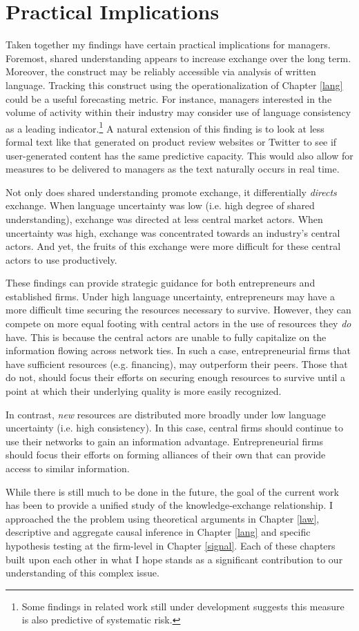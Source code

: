 \section{Practical Implications}
Taken together my findings have certain practical implications for managers. Foremost, shared understanding appears to increase exchange over the long term. Moreover, the construct may be reliably accessible via analysis of written language. Tracking this construct using the operationalization of Chapter \ref{lang} could be a useful forecasting metric. For instance, managers interested in the volume of activity within their industry may consider use of language consistency as a leading indicator.\footnote{Some findings in related work still under development suggests this measure is also predictive of systematic risk.} A natural extension of this finding is to look at less formal text like that generated on product review websites or Twitter to see if user-generated content has the same predictive capacity. This would also allow for measures to be delivered to managers as the text naturally occurs in real time.

Not only does shared understanding promote exchange, it differentially \emph{directs} exchange. When language uncertainty was low (i.e. high degree of shared understanding), exchange was directed at less central market actors. When uncertainty was high, exchange was concentrated towards an industry's central actors. And yet, the fruits of this exchange were more difficult for these central actors to use productively. 

These findings can provide strategic guidance for both entrepreneurs and established firms. Under high language uncertainty, entrepreneurs may have a more difficult time securing the resources necessary to survive. However, they can compete on more equal footing with central actors in the use of resources they \emph{do} have. This is because the central actors are unable to fully capitalize on the information flowing across network ties. In such a case, entrepreneurial firms that have sufficient resources (e.g. financing), may outperform their peers. Those that do not, should focus their efforts on securing enough resources to survive until a point at which their underlying quality is more easily recognized.

In contrast, \emph{new} resources are distributed more broadly under low language uncertainty (i.e. high consistency). In this case, central firms should continue to use their networks to gain an information advantage. Entrepreneurial firms should focus their efforts on forming alliances of their own that can provide access to similar information.

While there is still much to be done in the future, the goal of the current work has been to provide a unified study of the knowledge-exchange relationship. I approached the the problem using theoretical arguments in Chapter \ref{law}, descriptive and aggregate causal inference in Chapter \ref{lang} and specific hypothesis testing at the firm-level in Chapter \ref{signal}. Each of these chapters built upon each other in what I hope stands as a significant contribution to our understanding of this complex issue.

